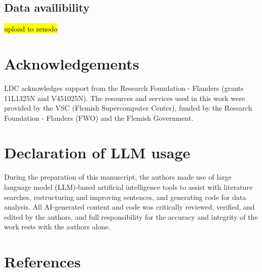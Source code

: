 \documentclass[
  sn-nature,
]{sn-jnl}
\begin{document}
\subsection{Data availibility}\label{data-availibility}

\hl{upload to zenodo}

\section{Acknowledgements}\label{acknowledgements}

LDC acknowledges support from the Research Foundation - Flanders (grants
11L1325N and V451025N). The resources and services used in this work
were provided by the VSC (Flemish Supercomputer Center), funded by the
Research Foundation - Flanders (FWO) and the Flemish Government.

\section{Declaration of LLM usage}\label{declaration-of-llm-usage}

During the preparation of this manuscript, the authors made use of large
language model (LLM)-based artificial intelligence tools to assist with
literature searches, restructuring and improving sentences, and
generating code for data analysis. All AI-generated content and code was
critically reviewed, verified, and edited by the authors, and full
responsibility for the accuracy and integrity of the work rests with the
authors alone.

\section{References}\label{references}
\end{document}
